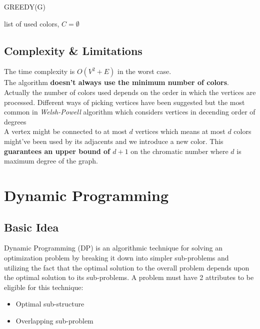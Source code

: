 \documentclass[14pt]{extreport}
\begin{document}
    	\begin{algorithm}[ht]
    	    \ttfamily
		    \caption{GREEDY(G)}
            
            list of used colors, $C = \emptyset$ \\
		\end{algorithm}
	
    	\section{Complexity \& Limitations}
    	
    		\vspace{20pt}
   			The time complexity is $O(V^2 + E)$ in the worst case. \\
   			
   			The algorithm \textbf{doesn't always use the minimum number of colors}. Actually the number of colors used depends on the order in which the vertices are processed. Different ways of picking vertices have been suggested but the most common in \textit{Welsh-Powell} algorithm which considers vertices in decending order of degrees \\ 
   			
   			A vertex might be connected to at most $d$ vertices which means at most $d$ colors might've been used by its adjacents and we introduce a new color. This \textbf{guarantees an upper bound of $d+1$} on the chromatic number where $d$ is maximum degree of the graph.
    	
    		\pagebreak
	
	\chapter{Dynamic Programming}
	
	\section{Basic Idea}	
		Dynamic Programming (DP) is an algorithmic technique for solving an optimization problem by breaking it down into simpler sub-problems and utilizing the fact that the optimal solution to the overall problem depends upon the optimal solution to its sub-problems. A problem must have 2 attributes to be eligible for this technique: 
		\begin{itemize}
		    \item Optimal sub-structure
		    \item Overlapping sub-problem
		\end{itemize}
		
\end{document}
